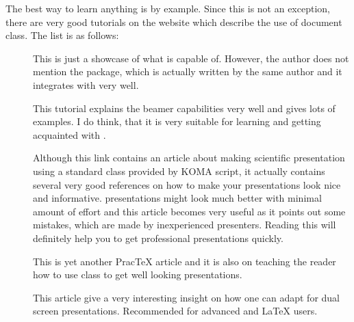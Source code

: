 \documentclass[
    draft
]{scrartcl}
\begin{document}
%
The best way to learn anything is by example.
%
Since this is not an exception, there are very good tutorials on the website
    which describe the use of  document class.
%
The list is as follows:
%
\begin{description}
    \item
        [] 
        This is just a showcase of what  is capable of.
        However, the author does not mention the  package, which is
            actually written by the same author and it integrates with
             very well.
    \item
        [] 
        This tutorial explains the beamer capabilities very well and gives lots
            of examples.
        I do think, that it is very suitable for learning and getting acquainted
            with .
    \item
        []
        Although this link contains an article about making scientific
            presentation using a standard  class provided by KOMA
            script, it actually contains several very good references on how to
            make your presentations look nice and informative.
         presentations might look much better with minimal amount of
            effort and this article becomes very useful as it points out some
            mistakes, which are made by inexperienced presenters.
        Reading this will definitely help you to get professional presentations
            quickly.
    \item
        []
        This is yet another Prac\TeX{} article and it is also on teaching the
            reader how to use  class to get well looking
            presentations.
    \item
        []
        This article give a very interesting insight on how one can adapt
             for dual screen presentations.
        Recommended for advanced  and \LaTeX{} users.
\end{description}
\end{document}
